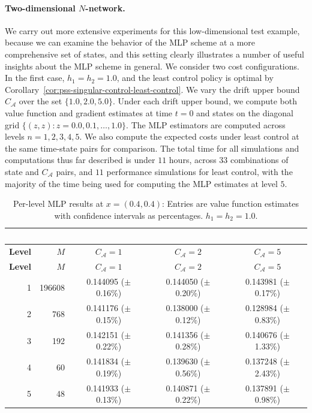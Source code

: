 \documentclass[11pt]{article}
\theoremstyle{definition}
\theoremstyle{plain}
\begin{document}
\paragraph{Two-dimensional $N$-network.} 
We carry out more extensive experiments for this low-dimensional test example, 
because we can examine the behavior of the MLP scheme at a more comprehensive set of states, 
and this setting clearly illustrates a number of useful insights about the MLP scheme in general. 
We consider two cost configurations. In the first case, $h_1 = h_2 = 1.0$, 
and the least control policy is optimal by Corollary~\ref{cor:pss-singular-control-least-control}. 
We vary the drift upper bound $C_{\mathcal{A}}$ over the set $\{1.0, 2.0, 5.0\}$. 
Under each drift upper bound, we compute both value function and gradient estimates at time $t=0$ and 
states on the diagonal grid $\{(z,z): z=0.0, 0.1, \dots, 1.0\}$. 
The MLP estimators are computed across levels $n=1,2,3,4,5$. 
We also compute the expected costs under least control at the same time-state pairs for comparison. 
The total time for all simulations and computations thus far described is under $11$ hours, across $33$ combinations 
of state and $C_{\mathcal{A}}$ pairs, and $11$ performance simulations for least control, 
with the majority of the time being used for computing the MLP estimates at level $5$.
\begin{longtable}{@{}r r c c c@{}}
  \caption{Per-level MLP results at $x=(0.4,0.4)$: Entries are value function estimates with confidence intervals as percentages. 
  $h_1 = h_2 = 1.0$.}\label{tab:summary-04}\ \\
  \toprule
  \textbf{Level} & \textbf{$M$} & \textbf{$C_{\mathcal A}=1$} & \textbf{$C_{\mathcal A}=2$} & \textbf{$C_{\mathcal A}=5$} \\
  \midrule
  \endfirsthead
  \toprule
  \textbf{Level} & \textbf{$M$} & \textbf{$C_{\mathcal A}=1$} & \textbf{$C_{\mathcal A}=2$} & \textbf{$C_{\mathcal A}=5$} \\
  \midrule
  \endhead
  1 & 196608 & 0.144095 (\(\pm\) 0.16\%) & 0.144050 (\(\pm\) 0.20\%) & 0.143981 (\(\pm\) 0.17\%) \\
  2 & 768     & 0.141176 (\(\pm\) 0.15\%) & 0.138000 (\(\pm\) 0.12\%) & 0.128984 (\(\pm\) 0.83\%) \\
  3 & 192     & 0.142151 (\(\pm\) 0.22\%) & 0.141356 (\(\pm\) 0.28\%) & 0.140676 (\(\pm\) 1.33\%) \\
  4 & 60      & 0.141834 (\(\pm\) 0.19\%) & 0.139630 (\(\pm\) 0.56\%) & 0.137248 (\(\pm\) 2.43\%) \\
  5 & 48      & 0.141933 (\(\pm\) 0.13\%) & 0.140871 (\(\pm\) 0.22\%) & 0.137891 (\(\pm\) 0.98\%) \\
  \bottomrule
\end{longtable}
\end{document}
